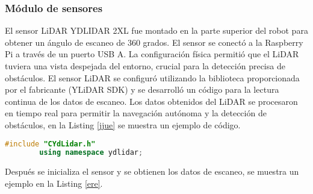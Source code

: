     \subsubsection{M\'odulo de sensores}
    El sensor LiDAR YDLIDAR 2XL fue montado en la parte superior del robot para obtener
        un \'angulo de escaneo de 360 grados. El sensor se conect\'o a la Raspberry Pi a trav\'es de
        un puerto USB A. La configuraci\'on f\'isica permiti\'o que el LiDAR tuviera una vista
        despejada del entorno, crucial para la detecci\'on precisa de obst\'aculos.
    \vskip 0.5cm
    El sensor LiDAR se configur\'o utilizando la biblioteca proporcionada por el fabricante
        (YLiDAR SDK) y se desarroll\'o un c\'odigo para la lectura continua de los datos de escaneo.
        Los datos obtenidos del LiDAR se procesaron en tiempo real para permitir la
        navegaci\'on aut\'onoma y la detecci\'on de obst\'aculos, en la Listing \ref{jjue} se muestra un ejemplo de c\'odigo.
    \vskip 0.5cm
    \begin{lstlisting}[language={C++}, caption={Primero se implementa la librer\'ia del LiDAR}, label={jjue}]
        #include "CYdLidar.h"
        using namespace ydlidar;
    \end{lstlisting}
    \vskip 0.5cm
    Despu\'es se inicializa el sensor y se obtienen los datos de escaneo, se muestra un ejemplo en la Listing \ref{ere}.
    \vskip 0.5cm
